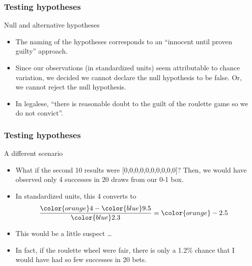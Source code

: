 \documentclass[handout]{beamer}
\begin{document}

   \begin{frame} \frametitle{Testing hypotheses}

   \begin{block}
   {Null and alternative hypotheses}
   \begin{itemize}

   \item The naming of the hypotheses corresponds to an ``innocent until proven guilty'' approach.

   \item Since our observations (in standardized units) seem attributable to chance
   variation, we decided we cannot declare the null hypothesis to be false. Or,
   we cannot reject the null hypothesis.

   \item In
   legalese, ``there is reasonable doubt to the guilt of the roulette game so we do not convict''.

   \end{itemize}
   \end{block}
   \end{frame}


   \begin{frame} \frametitle{Testing hypotheses}

   \begin{block}
   {A different scenario}
   \begin{itemize}

   \item What if the second 10 results were [0,0,0,0,0,0,0,0,0,0]? Then,
   we would have observed only 4 successes in 20 draws from our 0-1 box.

   \item In standardized units, this 4 converts to
   $$
   \frac{{\color{orange} 4} - {\color{blue} 9.5}}{{\color{blue} 2.3}} = {\color{orange} -2.5}
   $$

   \item This would be a little suspect \dots

   \item In fact, if the roulette wheel were fair, there is only a 1.2\% chance
   that I would have had so few successes in 20 bets.

   \end{itemize}
   \end{block}
   \end{frame}
\end{document}

